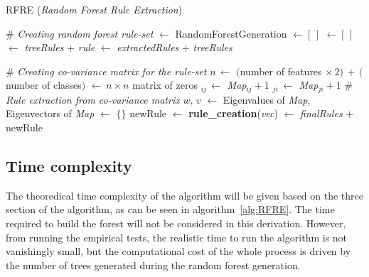 \documentclass[11pt]{article}
\begin{document}
\begin{algorithm}[!ht]
\caption{RFRE (\textit{Random Forest Rule Extraction})}\label{alg:RFRE}
\begin{algorithmic}
\State \# {\sl Creating random forest rule-set}
 $\gets$ RandomForestGeneration		
 $\gets [\, ]$
	  $\gets [\,]$
		 $\gets$ {\sl treeRules} $+$ {\sl rule} 
	\EndFor
	 $\gets$ {\sl extractedRules} + {\sl treeRules}
\EndFor

\State
\State \# {\sl Creating co-variance matrix for the rule-set}
\State $n \, \gets$ $($number of features $\times \, 2) \, + \,($number of classes$)$ 
 $\gets \, n\times n$ matrix of zeros
		$_{ij} \, \gets$  {\sl Map}$_{ij} + 1$
		$_{ji} \, \gets$  {\sl Map}$_{ji} + 1$
	\EndIf
\EndFor
\State 
\State \# {\sl Rule extraction from co-variance matrix}
\State $w, \, v$ $\gets$ Eigenvalues of {\sl Map}, Eigenvectors of {\sl Map }
 $\gets$ $\{\}$
	\State newRule $\gets $ \textbf{rule\_creation}({\sl  vec})
	 $\gets$ {\sl finalRules} $+$ newRule
	\EndIf
\EndFor
\State {}
\end{algorithmic}
\end{algorithm}

\subsection{Time complexity}
The theoredical time complexity of the algorithm will be given based on the three section of the algorithm, as can be seen in algorithm~\ref{alg:RFRE}. The time required to build the forest will not be considered in this derivation. However, from running the empirical tests, the realistic time to run the algorithm is not vanishingly small, but the computational cost of the whole process is driven by the number of trees generated during the random forest generation.
\end{document}
